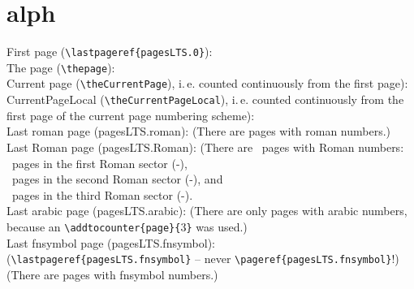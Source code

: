 \documentclass[british]{article}
\def\pagesLTSexampleArabic{3}
\begin{document}
\newpage


\section{alph\label{alph}}

\noindent First page (\verb|\lastpageref{pagesLTS.0}|):
 \\

\noindent The page (\verb|\thepage|): \thepage \\

\noindent Current page (\verb|\theCurrentPage|),
i.\,e. counted continuously from the first page): \theCurrentPage \\

\noindent CurrentPageLocal (\verb|\theCurrentPageLocal|),
i.\,e. counted continuously from the first page of the
current page numbering scheme): \theCurrentPageLocal \\

\noindent Last roman page (pagesLTS.roman): 
(There are  pages with roman numbers.)\\

\noindent Last Roman page (pagesLTS.Roman): 
(There are ~pages with Roman numbers:\\
~pages in the first Roman sector
(\pageref{Roman}{\hskip3em }-),\\
~pages in the second Roman sector
(\pageref{Roman2}{\hskip3em }-), and\\
~pages in the third Roman sector
(\pageref{Roman3}{\hskip3em }-).\\

\noindent Last arabic page (pagesLTS.arabic): 
(There are only  pages with arabic numbers,
because an \verb|\addtocounter{page}{|\pagesLTSexampleArabic\verb|}| was used.)\\

\noindent Last fnsymbol page (pagesLTS.fnsymbol):  \\
(\verb|\lastpageref{pagesLTS.fnsymbol}| -- never \verb|\pageref{pagesLTS.fnsymbol}|!)\\
(There are  pages with fnsymbol numbers.)\\
\end{document}
